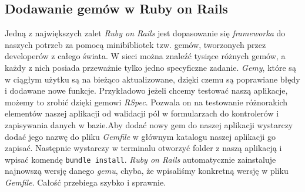 \documentclass[openright]{xmgr}
\begin{document}
\subsection{Dodawanie gemów w Ruby on Rails}
Jedną z największych zalet \textit{Ruby on Rails} jest dopasowanie się \textit{frameworka} do naszych potrzeb za pomocą minibibliotek tzw. gemów, tworzonych przez developerów z całego świata.
W sieci można znaleźć tysiące różnych gemów, a każdy z nich posiada przeważnie tylko jedno specyficzne zadanie. \textit{Gemy}, które są w ciągłym użytku są na bieżąco aktualizowane, dzięki czemu są poprawiane błędy i dodawane nowe funkcje. Przykładowo jeżeli chcemy testować naszą aplikacje, możemy to zrobić dzięki gemowi \textit{RSpec}. Pozwala on na testowanie różnorakich elementów naszej aplikacji od walidacji pól w formularzach do kontrolerów i zapisywania danych w bazie.\newline \indent Aby dodać nowy gem do naszej aplikacji wystarczy dodać jego nazwę do pliku \textit{Gemfile} w głównym katalogu naszej aplikacji go zapisać. Następnie wystarczy w terminalu otworzyć folder z naszą aplikacją i wpisać komendę \verb|bundle install|. \textit{Ruby on Rails} automatycznie zainstaluje najnowszą wersję danego \textit{gemu}, chyba, że wpisaliśmy konkretną wersję w pliku \textit{Gemfile}. Całość przebiega szybko i sprawnie.
\end{document}
